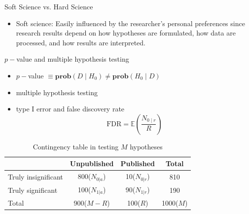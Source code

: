 \documentclass[UTF8, 16pt]{beamer}
\begin{document}
\begin{CJK*}{UTF8}{gbsn}
\begin{frame}{Soft Science vs. Hard Science}
\begin{itemize}
		\item Soft science: Easily influenced by the researcher's personal preferences since research results depend on how hypotheses are formulated, how data are processed, and how results are interpreted.
	\end{itemize}
\end{frame}
\begin{frame}{$p-$value and multiple hypothesis testing}
	\begin{itemize}
		\item $p-$value $\equiv \textbf{prob}(D\mid H_0) \neq \textbf{prob}(H_0\mid D)$
		\item multiple hypothesis testing
		\item type I error and false discovery rate 
		$$\mathrm{FDR} = \mathbb{E}(\frac{N_{0 \mid r}}{R})$$
	\end{itemize}
	\vspace{-0.5cm}
	\begin{table}
	    \centering
	    \caption{Contingency table in testing $M$ hypotheses}
	    \vspace{-0.5cm}
	    \setlength{\tabcolsep}{2mm}
		    {
		    \begin{tabular}{lccc}
		    \hline
	         & Unpublished & Published & Total\\ \hline
	        Truly insignificant & 800($N_{0|a}$) & \alert{10($N_{0|r}$)} & 810\\ 
	        Truly significant & 100($N_{1|a}$) & 90($N_{1|r}$) & 190\\
	        Total & 900($M-R$) & 100($R$) & 1000($M$)\\ \hline
		    \end{tabular}
		    }
	    \label{fig1}
	\end{table}
\end{frame}

\end{CJK*}
\end{document}
